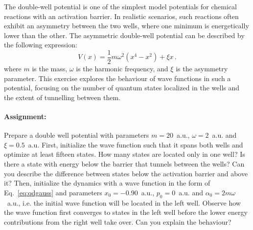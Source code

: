 The double-well potential is one of the simplest model potentials for chemical reactions with an activation barrier. In realistic scenarios, such reactions often exhibit an asymmetry between the two wells, where one minimum is energetically lower than the other. The asymmetric double-well potential can be described by the following expression:
\begin{equation*}
    V(x) = \frac{1}{2}m\omega^2(x^4 - x^2) + \xi x \, .
\end{equation*}
where $m$ is the mass, $\omega$ is the harmonic frequency, and $\xi$ is the asymmetry parameter. This exercise explores the behaviour of wave functions in such a potential, focusing on the number of quantum states localized in the wells and the extent of tunnelling between them.

\paragraph{Assignment:} Prepare a double well potential with parameters $m=20$~a.u., $\omega=2$~a.u. and $\xi=0.5$~a.u. First, initialize the wave function such that it spans both wells and optimize at least fifteen states. 
How many states are located only in one well? Is there a state with energy below the barrier that tunnels between the wells? Can you describe the difference between states below the activation barrier and above it?
Then, initialize the dynamics with a wave function in the form of Eq.~\eqref{eq:qdgauss} and parameters $x_0=-0.90$~a.u., $p_0=0$~a.u. and $\alpha_0 = 2m\omega$~a.u., i.e. the initial wave function will be located in the left well. Observe how the wave function first converges to states in the left well before the lower energy contributions from the right well take over. Can you explain the behaviour?







